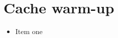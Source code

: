 \documentclass[11pt]{article}
\begin{document}
\section*{Cache warm-up}
\begin{itemize}
  \item Item one
\end{itemize}
\end{document}

